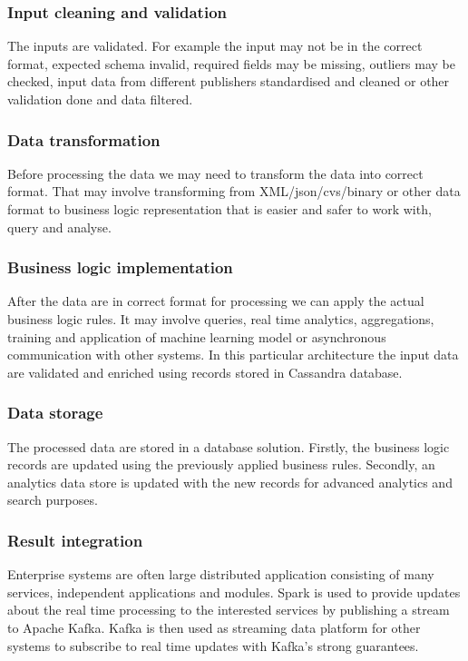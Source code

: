 \documentclass[a4paper, 10 pt, conference]{IEEEtran}
\begin{document}
\subsubsection{Input cleaning and validation}
The inputs are validated. For example the input may not be in the correct format, expected schema invalid, required fields may be missing, outliers may be checked, input data from different publishers standardised and cleaned or other validation done and data filtered.

\subsubsection{Data transformation}
Before processing the data we may need to transform the data into correct format. That may involve transforming from XML/json/cvs/binary or other data format to business logic representation that is easier and safer to work with, query and analyse.

\subsubsection{Business logic implementation}
After the data are in correct format for processing we can apply the actual business logic rules. It may involve queries, real time analytics, aggregations, training and application of machine learning model or asynchronous communication with other systems. In this particular architecture the input data are validated and enriched using records stored in Cassandra database.

\subsubsection{Data storage}
The processed data are stored in a database solution. Firstly, the business logic records are updated using the previously applied business rules. Secondly, an analytics data store is updated with the new records for advanced analytics and search purposes. 

\subsubsection{Result integration}
Enterprise systems are often large distributed application consisting of many services, independent applications and modules. Spark is used to provide updates about the real time processing to the interested services by publishing a stream to Apache Kafka. Kafka is then used as streaming data platform for other systems to subscribe to real time updates with Kafka's strong guarantees.
\end{document}

